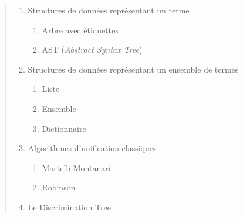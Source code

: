 \documentclass[11pt]{article}
\begin{document}
\begin{titlepage}
\begin{center}
\begin{minipage}{0.8\textwidth}
            \vspace{0.3cm}
             \dotfill \pageref{structures}
            \begin{quote}
                \begin{enumerate}[label=\arabic*., leftmargin=1.5em, itemsep=0.1em]
                    \item Structures de données représentant un terme
                    \begin{enumerate}[label=\alph*., leftmargin=1.5em, itemsep=0em]
                        \item Arbre avec étiquettes
                        \item AST (\textit{Abstract Syntax Tree})
                    \end{enumerate}
                    \item Structures de données représentant un ensemble de termes
                    \begin{enumerate}[label=\alph*., leftmargin=1.5em, itemsep=0em]
                        \item Liste
                        \item Ensemble
                        \item Dictionnaire
                    \end{enumerate}
                    \item Algorithmes d'unification classiques
                    \begin{enumerate}[label=\alph*., leftmargin=1.5em, itemsep=0em]
                        \item Martelli-Montanari
                        \item Robinson
                    \end{enumerate}
                    \item Le Discrimination Tree
                \end{enumerate}
            \end{quote}

            \vspace{0.3cm}
             \dotfill \pageref{algorithmes}
            \begin{quote}
                \begin{enumerate}[label=\arabic*., leftmargin=1.5em, itemsep=0.1em]
                    

\end{enumerate}
\end{quote}
\end{minipage}
\end{center}
\end{titlepage}
\end{document}
